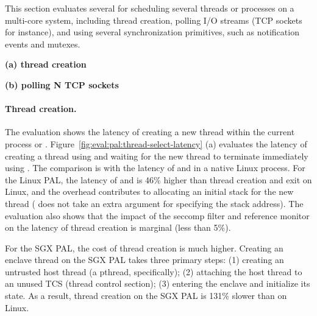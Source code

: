 This section evaluates several \hostapis{} for scheduling several threads or processes
on a multi-core system,
including thread creation, polling I/O streams (TCP sockets for instance), and using several synchronization primitives,
such as notification events and mutexes. 


\begin{figure*}[t!]
\centering
\footnotesize
{}
\parbox{0.49\textwidth}{\centering\bf (a) thread creation}
\parbox{0.49\textwidth}{\centering\bf (b) polling N TCP sockets}
\caption{(a) Thread creation latency and (b) latency of polling a number of TCP sockets.
Lower is better.
The comparison is between (1)  and  on Linux; (2)  and  on the Linux PAL, with and without a \seccomp{} filter ({\bf +SC}) and reference monitor ({\bf +RM}); (3) the same \hostapis{} on the SGX PAL.}
\label{fig:eval:pal:thread-select-latency}
\end{figure*}


\paragraph{Thread creation.}
The evaluation shows the latency of creating a new thread within the current process or \picoproc{}.
Figure~\ref{fig:eval:pal:thread-select-latency} (a)
evaluates the latency of creating a thread using  and waiting for the new thread to terminate immediately using .
The comparison is with the latency of 
and  in a native Linux process.
For the Linux PAL,
the latency of  and  is \roughly{}46\% higher
than thread creation and exit on Linux,
and the overhead contributes
to allocating an initial stack for the new thread ( does not take an extra argument for specifying the stack address).
The evaluation also shows that the impact of the seccomp{} filter and reference monitor on the latency of thread creation is marginal (less than 5\%).


For the SGX PAL, the cost of thread creation is much higher.
Creating an enclave thread on the SGX PAL takes three primary steps: (1) creating an untrusted host thread (a pthread, specifically); (2) attaching the host thread to an unused TCS (thread control section); (3) entering the enclave and initialize its state.
As a result, thread creation on the SGX PAL is \roughly{}131\% slower than  on Linux.




